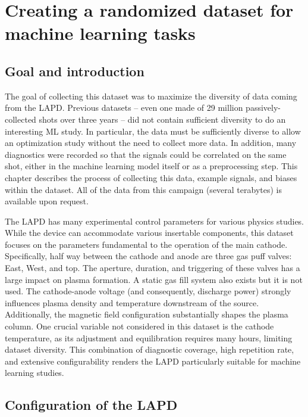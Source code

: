 \graphicspath{{Chapters/Chapter_ml-dataruns/}}

\chapter{Creating a randomized  dataset for machine learning tasks}
\label{ch:ml-dataruns}

\section{Goal and introduction}

The goal of collecting this dataset was to maximize the diversity of data coming from the LAPD. Previous datasets -- even one made of 29 million passively-collected shots over three years -- did not contain sufficient diversity to do an interesting ML study. In particular, the data must be sufficiently diverse to allow an optimization study without the need to collect more data. In addition, many diagnostics were recorded so that the signals could be correlated on the same shot, either in the machine learning model itself or as a preprocessing step. This chapter describes the process of collecting this data, example signals, and biases within the dataset. All of the data from this campaign (several terabytes) is available upon request. 

The LAPD has many experimental control parameters for various physics studies. While the device can accommodate various insertable components, this dataset focuses on the parameters fundamental to the operation of the main cathode. Specifically, half way between the cathode and anode are three gas puff valves: East, West, and top. The aperture, duration, and triggering of these valves has a large impact on plasma formation. A static gas fill system also exists but it is not used. The cathode-anode voltage (and consequently, discharge power) strongly influences plasma density and temperature downstream of the source. Additionally, the magnetic field configuration substantially shapes the plasma column. One crucial variable not considered in this dataset is the cathode temperature, as its adjustment and equilibration requires many hours, limiting dataset diversity. This combination of diagnostic coverage, high repetition rate, and extensive configurability renders the LAPD particularly suitable for machine learning studies. 

\section{Configuration of the LAPD}

